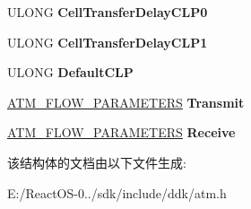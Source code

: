 \begin{DoxyCompactItemize}
\item 
\mbox{\label{struct___a_t_m___m_e_d_i_a___p_a_r_a_m_e_t_e_r_s_aba561cb25591ff7480596b56ad7f40e6}} 
U\+L\+O\+NG {\bfseries Cell\+Transfer\+Delay\+C\+L\+P0}
\item 
\mbox{\label{struct___a_t_m___m_e_d_i_a___p_a_r_a_m_e_t_e_r_s_a2cb4a44449c3b426985c305dd87aca99}} 
U\+L\+O\+NG {\bfseries Cell\+Transfer\+Delay\+C\+L\+P1}
\item 
\mbox{\label{struct___a_t_m___m_e_d_i_a___p_a_r_a_m_e_t_e_r_s_a9238a1776a51a528794f890b5220c220}} 
U\+L\+O\+NG {\bfseries Default\+C\+LP}
\item 
\mbox{\label{struct___a_t_m___m_e_d_i_a___p_a_r_a_m_e_t_e_r_s_a4ac3a36bf40b8ecc077339b86e421165}} 
\hyperlink{struct___a_t_m___f_l_o_w___p_a_r_a_m_e_t_e_r_s}{A\+T\+M\+\_\+\+F\+L\+O\+W\+\_\+\+P\+A\+R\+A\+M\+E\+T\+E\+RS} {\bfseries Transmit}
\item 
\mbox{\label{struct___a_t_m___m_e_d_i_a___p_a_r_a_m_e_t_e_r_s_a945b80fe2d513e23398a7f308a23171a}} 
\hyperlink{struct___a_t_m___f_l_o_w___p_a_r_a_m_e_t_e_r_s}{A\+T\+M\+\_\+\+F\+L\+O\+W\+\_\+\+P\+A\+R\+A\+M\+E\+T\+E\+RS} {\bfseries Receive}
\end{DoxyCompactItemize}


该结构体的文档由以下文件生成\+:\begin{DoxyCompactItemize}
\item 
E\+:/\+React\+O\+S-\/0../sdk/include/ddk/atm.\+h\end{DoxyCompactItemize}
